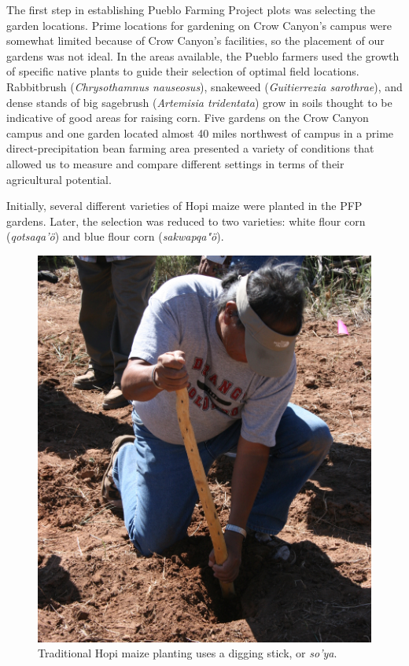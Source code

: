 \documentclass[12pt,]{article}
\begin{document}
The first step in establishing Pueblo Farming Project plots was selecting the garden locations. Prime locations for gardening on Crow Canyon's campus were somewhat limited because of Crow Canyon's facilities, so the placement of our gardens was not ideal. In the areas available, the Pueblo farmers used the growth of specific native plants to guide their selection of optimal field locations. Rabbitbrush (\emph{Chrysothamnus nauseosus}), snakeweed (\emph{Guitierrezia sarothrae}), and dense stands of big sagebrush (\emph{Artemisia tridentata}) grow in soils thought to be indicative of good areas for raising corn. Five gardens on the Crow Canyon campus and one garden located almost 40 miles northwest of campus in a prime direct-precipitation bean farming area presented a variety of conditions that allowed us to measure and compare different settings in terms of their agricultural potential.

Initially, several different varieties of Hopi maize were planted in the PFP gardens. Later, the selection was reduced to two varieties: white flour corn (\emph{qotsaqa'ö}) and blue flour corn (\emph{sakwapqa"ö}).

\begin{figure}
\centering
\includegraphics{./images/chapter_6_soya.jpg}
\caption{Traditional Hopi maize planting uses a digging stick, or \emph{so'ya}.}
\end{figure}
\end{document}
